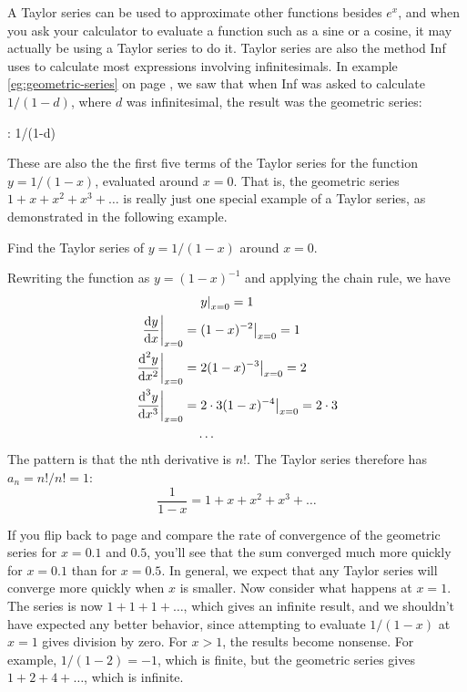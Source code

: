 A Taylor series can be used to approximate other functions besides $e^x$, and when you ask your calculator to evaluate a
function such as a sine or a cosine, it may actually be using a Taylor series to do it.
Taylor series are also the method Inf uses to calculate most expressions involving infinitesimals. In example
\ref{eg:geometric-series} on page \pageref{eg:geometric-series}, we saw that
when Inf was asked to calculate $1/(1-d)$, where $d$ was infinitesimal, the result was the geometric series:
\begin{Code}
  \ii : 1/(1-d)
\end{Code}
These are also the the first five terms of the Taylor series for the function $y=1/(1-x)$, evaluated around $x=0$.
That is, the geometric series $1+x+x^2+x^3+\ldots$ is really just one special example of a Taylor series, as
demonstrated in the following example.

\begin{eg}\label{eg:taylor-geometric}
\egquestion Find the Taylor series of $y=1/(1-x)$ around $x=0$.

\eganswer Rewriting the function as $y=(1-x)^{-1}$ and applying the chain rule, we have
\begin{align*}
                                                & \left.y\right|_{x=0} = 1\\
  \left.\frac{\textup{d} y}{\textup{d} x}\right|_{x=0}     =& \left.(1-x)^{-2}\right|_{x=0} = 1\\
  \left.\frac{\textup{d}^2 y}{\textup{d} x^2}\right|_{x=0} =& \left.2(1-x)^{-3}\right|_{x=0} = 2\\
  \left.\frac{\textup{d}^3 y}{\textup{d} x^3}\right|_{x=0} =& \left.2\cdot3(1-x)^{-4}\right|_{x=0} = 2\cdot3\\
                                                & \ldots
\end{align*}
The pattern is that the nth derivative is $n!$. The Taylor series therefore has $a_n=n!/n!=1$:
\begin{equation*}
  \frac{1}{1-x} =  1+x+x^2+x^3+\ldots
\end{equation*}
\end{eg}

If you flip back to page \pageref{geometric-tenths} and compare the rate of convergence of the geometric
series for $x=0.1$ and $0.5$, you'll see that the sum converged 
much more quickly for $x=0.1$ than for $x=0.5$. In general, we expect
that any Taylor series will converge more quickly when $x$ is smaller. Now consider what happens at $x=1$. The series
is now $1+1+1+\ldots$, which gives an infinite result, and we shouldn't have expected any better behavior, since
attempting to evaluate $1/(1-x)$ at $x=1$ gives division by zero. For $x>1$, the results become nonsense.
For example, $1/(1-2)=-1$, which is finite, but the geometric series gives $1+2+4+\ldots$, which is infinite.


